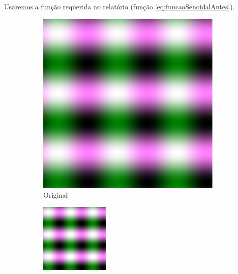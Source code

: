 \documentclass{article}
\begin{document}
Usaremos a função requerida no relatório (função \ref{eq:funcaoSenoidalAntes}).
\begin{figure}[ht]
  \centering
  \begin{subfigure}{0.3\textwidth}
    \centering
    \includegraphics[width=\textwidth]{senoidal/senoidal.png}
    \caption{Original}
  \end{subfigure}%
  \hfill
  \begin{subfigure}{0.3\textwidth}
    \centering
    \includegraphics[width=\textwidth]{senoidal/decompress3vezes/compressed.png}

\end{subfigure}
\end{figure}
\end{document}
